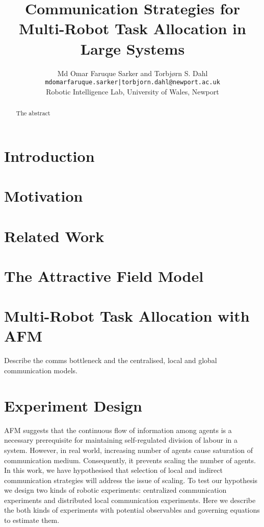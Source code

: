 \documentclass{article}
\begin{document}
\title{Communication Strategies for Multi-Robot Task Allocation in Large Systems}
\author{
Md Omar Faruque Sarker and Torbj{\o}rn S. Dahl\\
{\tt mdomarfaruque.sarker|torbjorn.dahl@newport.ac.uk}\\
Robotic Intelligence Lab, University of Wales, Newport}
\date{}
\maketitle

\begin{abstract}
The abstract
\end{abstract}

\section{Introduction}

\section{Motivation}

\section{Related Work}

\section{The Attractive Field Model}

\section{Multi-Robot Task Allocation with AFM}
Describe the comms bottleneck and the centralised, local and global communication models.

\section{Experiment Design}

AFM suggests that the continuous flow of information among agents is a necessary prerequisite for maintaining self-regulated division of labour in a system. However, in real world, increasing number of agents cause saturation of communication medium. Consequently, it prevents scaling the number of agents. In this work, we have hypothesised that selection of local and indirect communication strategies will address the issue of scaling. To test our hypothesis we design two kinds of robotic experiments: centralized communication experiments and distributed local communication experiments. Here we describe the both kinds of experiments with potential observables and governing equations to estimate them.
%
\end{document}
